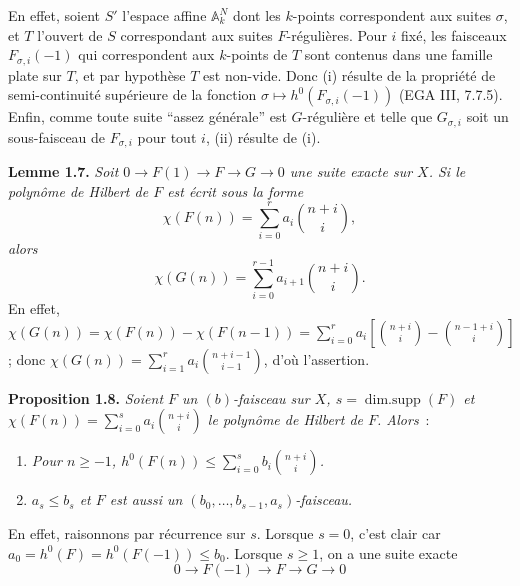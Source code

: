 
En
effet, soient \(S'\) l'espace affine \(\mathbb A_k^N\) dont les \(k\)-points correspondent aux suites \(\sigma\), et \(T\) l'ouvert de \(S\) correspondant aux suites \(F\)-régulières. Pour \(i\) fixé, les faisceaux \(F_{\sigma,i}(-1)\) qui correspondent aux \(k\)-points de \(T\) sont contenus dans une famille plate sur \(T\), et par hypothèse \(T\) est non-vide. Donc (i) résulte de la propriété de semi-continuité supérieure de la fonction $\sigma\longmapsto h^0(F_{\sigma,i}(-1))$ (EGA III, 7.7.5). Enfin, comme toute suite ``assez générale'' est \(G\)-régulière et telle que \(G_{\sigma,i}\) soit un sous-faisceau de \(F_{\sigma,i}\) pour tout \(i\), (ii) résulte de (i).

\textbf{Lemme 1.7.} \emph{Soit \(0\to F(1)\to F\to G\to0\) une suite exacte sur \(X\). Si le polynôme de Hilbert de \(F\) est écrit sous la forme}
\[
 \chi(F(n))=\sum_{i=0}^{r}a_i\binom{n+i}{i},
\]
\emph{alors}
\[
 \chi(G(n))=\sum_{i=0}^{r-1}a_{i+1}\binom{n+i}{i}.
\]
En effet, \(\chi(G(n))=\chi(F(n))-\chi(F(n-1))=\sum_{i=0}^{r}a_i\left[\binom{n+i}{i}-\binom{n-1+i}{i}\right]\); donc \(\chi(G(n))=\sum_{i=1}^{r}a_i\binom{n+i-1}{i-1}\), d'où l'assertion.

\textbf{Proposition 1.8.} \emph{Soient \(F\) un \((b)\)-faisceau sur \(X\), \(s=\operatorname{dim{.}supp}(F)\) et \(\chi(F(n))=\sum_{i=0}^{s}a_i\binom{n+i}{i}\) le polynôme de Hilbert de \(F\). Alors}~:
\begin{enumerate}[label=(\roman*)]
\item \emph{Pour \(n\ge -1\), \(h^0(F(n))\le \sum_{i=0}^{s}b_i\binom{n+i}{i}\).}
\item \emph{\(a_s\le b_s\) et \(F\) est aussi un \((b_0,\ldots,b_{s-1},a_s)\)-faisceau.}
\end{enumerate}
En effet, raisonnons par récurrence sur \(s\). Lorsque \(s=0\), c'est clair car \(a_0=h^0(F)=h^0(F(-1))\le b_0\). Lorsque \(s\ge1\), on a une suite exacte
\[
0\longrightarrow F(-1)\longrightarrow F\longrightarrow G\longrightarrow0
\]

